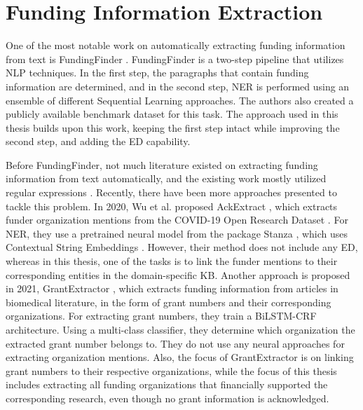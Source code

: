 \documentclass{report}
\theoremstyle{definition}
\theoremstyle{remark}
\begin{document}
\section{Funding Information Extraction}
\label{FundingDataExtraction}

    One of the most notable work on automatically extracting funding information from text is FundingFinder \cite{ElsPaper}. FundingFinder is a two-step pipeline that utilizes NLP techniques. In the first step, the paragraphs that contain funding information are determined, and in the second step, NER is performed using an ensemble of different Sequential Learning approaches. The authors also created a publicly available benchmark dataset for this task. The approach used in this thesis builds upon this work, keeping the first step intact while improving the second step, and adding the ED capability. 
    
    Before FundingFinder, not much literature existed on extracting funding information from text automatically, and the existing work mostly utilized regular expressions \cite{ElsPaper}. Recently, there have been more approaches presented to tackle this problem. In 2020, Wu et al. proposed AckExtract  \cite{AckExtract}, which extracts funder organization mentions from the COVID-19 Open Research Dataset \cite{CORD}. For NER, they use a pretrained neural model from the package Stanza \cite{stanza}, which uses Contextual String Embeddings \cite{flairpaper}. However, their method does not include any ED, whereas in this thesis, one of the tasks is to link the funder mentions to their corresponding entities in the domain-specific KB. Another approach is proposed in 2021, GrantExtractor \cite{GrantExtractor}, which extracts funding information from articles in biomedical literature, in the form of grant numbers and their corresponding organizations. For extracting grant numbers, they train a BiLSTM-CRF \cite{BiLSTMCRF} architecture. Using a multi-class classifier, they determine which organization the extracted grant number belongs to. They do not use any neural approaches for extracting organization mentions. Also, the focus of GrantExtractor is on linking grant numbers to their respective organizations, while the focus of this thesis includes extracting all funding organizations that financially supported the corresponding research, even though no grant information is acknowledged.
\end{document}
